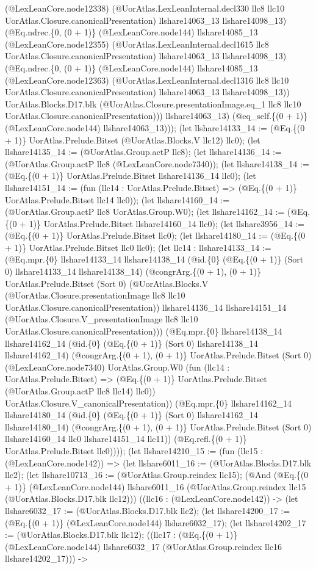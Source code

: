 \documentclass[11pt]{article}
\begin{document}
(@LexLeanCore.node12338) (@UorAtlas.LexLeanInternal.decl330 llc8 llc10 UorAtlas.Closure.canonicalPresentation) llshare14063\_13 llshare14098\_13) (@Eq.ndrec.\{0, (0 + 1)\} (@LexLeanCore.node144) llshare14085\_13 (@LexLeanCore.node12355) (@UorAtlas.LexLeanInternal.decl1615 llc8 UorAtlas.Closure.canonicalPresentation) llshare14063\_13 llshare14098\_13) (@Eq.ndrec.\{0, (0 + 1)\} (@LexLeanCore.node144) llshare14085\_13 (@LexLeanCore.node12363) (@UorAtlas.LexLeanInternal.decl1316 llc8 llc10 UorAtlas.Closure.canonicalPresentation) llshare14063\_13 llshare14098\_13)) UorAtlas.Blocks.D17.blk (@UorAtlas.Closure.presentationImage.eq\_1 llc8 llc10 UorAtlas.Closure.canonicalPresentation))) llshare14063\_13) (@eq\_self.\{(0 + 1)\} (@LexLeanCore.node144) llshare14063\_13))); (let llshare14133\_14 := (@Eq.\{(0 + 1)\} UorAtlas.Prelude.Bitset (@UorAtlas.Blocks.V llc12) llc0); (let llshare14135\_14 := (@UorAtlas.Group.actP llc8); (let llshare14136\_14 := (@UorAtlas.Group.actP llc8 (@LexLeanCore.node7340)); (let llshare14138\_14 := (@Eq.\{(0 + 1)\} UorAtlas.Prelude.Bitset llshare14136\_14 llc0); (let llshare14151\_14 := (fun (llc14 : UorAtlas.Prelude.Bitset) => (@Eq.\{(0 + 1)\} UorAtlas.Prelude.Bitset llc14 llc0)); (let llshare14160\_14 := (@UorAtlas.Group.actP llc8 UorAtlas.Group.W0); (let llshare14162\_14 := (@Eq.\{(0 + 1)\} UorAtlas.Prelude.Bitset llshare14160\_14 llc0); (let llshare3956\_14 := (@Eq.\{(0 + 1)\} UorAtlas.Prelude.Bitset llc0); (let llshare14180\_14 := (@Eq.\{(0 + 1)\} UorAtlas.Prelude.Bitset llc0 llc0); (let llc14 : llshare14133\_14 := (@Eq.mpr.\{0\} llshare14133\_14 llshare14138\_14 (@id.\{0\} (@Eq.\{(0 + 1)\} (Sort 0) llshare14133\_14 llshare14138\_14) (@congrArg.\{(0 + 1), (0 + 1)\} UorAtlas.Prelude.Bitset (Sort 0) (@UorAtlas.Blocks.V (@UorAtlas.Closure.presentationImage llc8 llc10 UorAtlas.Closure.canonicalPresentation)) llshare14136\_14 llshare14151\_14 (@UorAtlas.Closure.V\_presentationImage llc8 llc10 UorAtlas.Closure.canonicalPresentation))) (@Eq.mpr.\{0\} llshare14138\_14 llshare14162\_14 (@id.\{0\} (@Eq.\{(0 + 1)\} (Sort 0) llshare14138\_14 llshare14162\_14) (@congrArg.\{(0 + 1), (0 + 1)\} UorAtlas.Prelude.Bitset (Sort 0) (@LexLeanCore.node7340) UorAtlas.Group.W0 (fun (llc14 : UorAtlas.Prelude.Bitset) => (@Eq.\{(0 + 1)\} UorAtlas.Prelude.Bitset (@UorAtlas.Group.actP llc8 llc14) llc0)) UorAtlas.Closure.V\_canonicalPresentation)) (@Eq.mpr.\{0\} llshare14162\_14 llshare14180\_14 (@id.\{0\} (@Eq.\{(0 + 1)\} (Sort 0) llshare14162\_14 llshare14180\_14) (@congrArg.\{(0 + 1), (0 + 1)\} UorAtlas.Prelude.Bitset (Sort 0) llshare14160\_14 llc0 llshare14151\_14 llc11)) (@Eq.refl.\{(0 + 1)\} UorAtlas.Prelude.Bitset llc0)))); (let llshare14210\_15 := (fun (llc15 : (@LexLeanCore.node142)) => (let llshare6011\_16 := (@UorAtlas.Blocks.D17.blk llc2); (let llshare10713\_16 := (@UorAtlas.Group.reindex llc15); (@And (@Eq.\{(0 + 1)\} (@LexLeanCore.node144) llshare6011\_16 (@UorAtlas.Group.reindex llc15 (@UorAtlas.Blocks.D17.blk llc12))) ((llc16 : (@LexLeanCore.node142)) -> (let llshare6032\_17 := (@UorAtlas.Blocks.D17.blk llc2); (let llshare14200\_17 := (@Eq.\{(0 + 1)\} (@LexLeanCore.node144) llshare6032\_17); (let llshare14202\_17 := (@UorAtlas.Blocks.D17.blk llc12); ((llc17 : (@Eq.\{(0 + 1)\} (@LexLeanCore.node144) llshare6032\_17 (@UorAtlas.Group.reindex llc16 llshare14202\_17))) -> 
\end{document}
